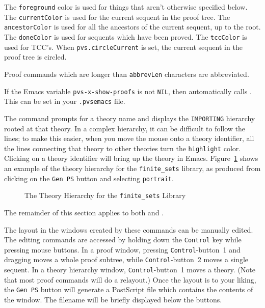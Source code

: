 The \texttt{foreground} color is used for things that aren't otherwise
specified below.  The \texttt{currentColor} is used for the current
sequent in the proof tree.  The \texttt{ancestorColor} is used for all
the ancestors of the current sequent, up to the root.  The
\texttt{doneColor} is used for sequents which have been proved.  The
\texttt{tccColor} is used for TCC's.  When \texttt{pvs.circleCurrent}
is set, the current sequent in the proof tree is circled.

Proof commands which are longer than \texttt{abbrevLen} characters are
abbreviated.

If the Emacs variable
\texttt{pvs-x-show-proofs}
is not \texttt{NIL}, then  automatically calls
.  This can be set in your
\texttt{.pvsemacs} file.

The  command prompts for a theory name and
displays the \texttt{IMPORTING} hierarchy rooted at that theory.  In a
complex hierarchy, it can be difficult to follow the lines; to make
this easier, when you move the mouse onto a theory identifier, all the
lines connecting that theory to other theories turn the
\texttt{highlight} color.  Clicking on a theory identifier will bring
up the theory in Emacs.  Figure~\ref{x-hierarchy} shows an example of the
theory hierarchy for the \texttt{finite\_sets} library, as produced from
clicking on the \texttt{Gen PS} button and selecting \texttt{portrait}.

\begin{figure}
\vspace{8in}
\caption{The Theory Hierarchy for the \texttt{finite\_sets} Library}\label{x-hierarchy}
\end{figure}


The remainder of this section applies to both  and
.

The layout in the windows created by these commands can be manually
edited.  The editing commands are accessed by holding down the
\texttt{Control} key while pressing mouse buttons. In a proof window,
pressing \texttt{Control}-button~1 and dragging moves a whole proof
subtree, while \texttt{Control}-button~2 moves a single sequent.  In a
theory hierarchy window, \texttt{Control}-button~1 moves a theory.
(Note that most proof commands will do a relayout.)  Once the layout
is to your liking, the \texttt{Gen~PS} button will generate a
PostScript file which contains the contents of the window.  The
filename will be briefly displayed below the buttons.

